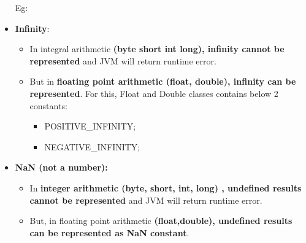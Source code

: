 \begin{flushleft}
\begin{itemize}
		Eg:
	
		\bigskip
		
		\item \textbf{Infinity}: 
		\begin{itemize}
			\item In integral arithmetic \textbf{(byte short int long)}\textbf{, infinity cannot be represented} and JVM will return runtime error.
			\bigskip
			
			\item But in \textbf{floating point arithmetic (float, double), infinity can be represented}.  For this, Float and Double classes contains below 2 constants:
			\begin{itemize}
				\item POSITIVE\_INFINITY;
				\item NEGATIVE\_INFINITY;
			\end{itemize}
			\bigskip		
		\end{itemize}
		
		\bigskip
		\item \textbf{NaN (not a number):}
		\begin{itemize}
			\item In \textbf{integer arithmetic (byte, short, int, long) , undefined results cannot be represented} and JVM will return runtime error.
			\bigskip
		
			\item But, in floating point arithmetic \textbf{(float,double), undefined results can be represented as NaN constant}.
			\bigskip
				
		\end{itemize} 
		
	\end{itemize}
	
\end{flushleft}

\newpage





